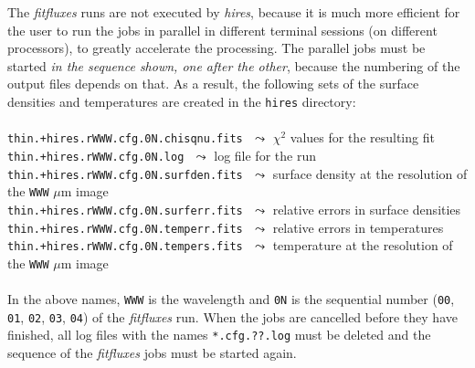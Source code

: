 \documentclass[a4paper,10pt]{article}
\begin{document}
The \textsl{fitfluxes} runs are not executed by \textsl{hires}, because it is much more efficient for the user to run the jobs in
parallel in different terminal sessions (on different processors), to greatly accelerate the processing. The parallel jobs must be
started \emph{in the sequence shown, one after the other}, because the numbering of the output files depends on that. 
As a result, the following sets of the surface densities and temperatures are created in
the \verb!hires! directory:\\
\vspace{-2mm}\noindent\\
{\small\verb!thin.+hires.rWWW.cfg.0N.chisqnu.fits!} $\,\,\leadsto$ $\chi^2$ values for the resulting fit\\
{\small\verb!thin.+hires.rWWW.cfg.0N.log!} $\,\,\leadsto$ log file for the run\\
{\small\verb!thin.+hires.rWWW.cfg.0N.surfden.fits!} $\,\,\leadsto$ surface density at the resolution of the \verb!WWW! $\mu$m image\\
{\small\verb!thin.+hires.rWWW.cfg.0N.surferr.fits!} $\,\,\leadsto$ relative errors in surface densities\\
{\small\verb!thin.+hires.rWWW.cfg.0N.temperr.fits!} $\,\,\leadsto$ relative errors in temperatures\\
{\small\verb!thin.+hires.rWWW.cfg.0N.tempers.fits!\vspace{-2mm}} $\,\,\leadsto$ temperature at the resolution of the \verb!WWW! $\mu$m image\\\\
In the above names, \verb!WWW! is the wavelength and \verb!0N! is the sequential number (\verb!00!, \verb!01!, \verb!02!,
\verb!03!, \verb!04!) of the \textsl{fitfluxes} run. When the jobs are cancelled before they have finished, all log files with the
names \verb!*.cfg.??.log! must be deleted and the sequence of the \textsl{fitfluxes} jobs must be started again.

\end{document}
